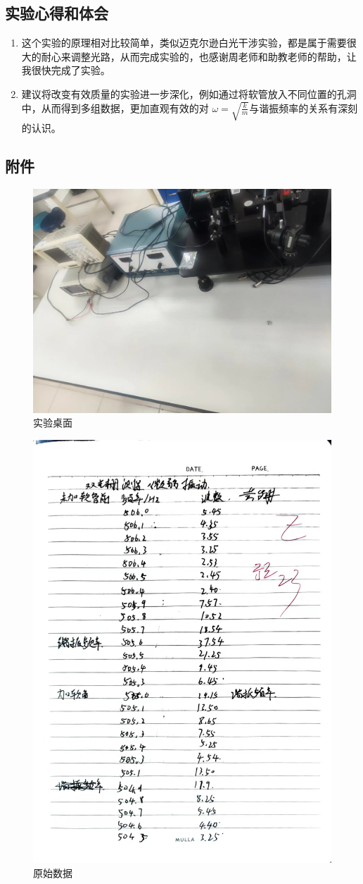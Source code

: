 \documentclass[dvipsnames, svgnames,a4paper,11pt]{article}
\begin{document}
	\subsection{实验心得和体会}
	\begin{enumerate}
		\item 这个实验的原理相对比较简单，类似迈克尔逊白光干涉实验，都是属于需要很大的耐心来调整光路，从而完成实验的，也感谢周老师和助教老师的帮助，让我很快完成了实验。
		\item 建议将改变有效质量的实验进一步深化，例如通过将软管放入不同位置的孔洞中，从而得到多组数据，更加直观有效的对 $\omega=\sqrt{\frac{k}{m}}$与谐振频率的关系有深刻的认识。
	\end{enumerate}
	
	
	
	\subsection{附件}
	\begin{figure}[H]
		\centering
		\includegraphics[width=0.4\linewidth]{images/桌面}
		\caption{实验桌面}
		\label{}
	\end{figure}
	\begin{figure}[H]
		\centering
		\includegraphics[width=0.3\linewidth]{images/原始数据}
		\caption{原始数据}
		\label{}
	\end{figure}
	
	
\end{document}
